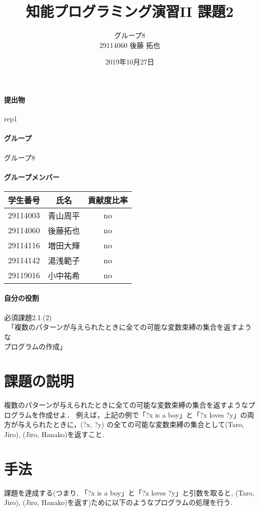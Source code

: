 \documentclass[uplatex,12pt]{jsarticle}
\title{知能プログラミング演習II 課題2}
\author{グループ8\\
  29114060 後藤 拓也\\
}
\date{2019年10月27日}
\begin{document}
\maketitle

\paragraph{提出物} rep1

\paragraph{グループ} グループ8

\paragraph{グループメンバー}
\begin{center}
\begin{tabular}{|c|c|c|}
  \hline
  学生番号&氏名&貢献度比率\\
  \hline\hline
  29114003&青山周平&no\\
  \hline
  29114060&後藤拓也&no\\
  \hline
  29114116&増田大輝&no\\
  \hline
  29114142&湯浅範子&no\\
  \hline
  29119016&小中祐希&no\\
  \hline
\end{tabular}
\end{center}
\paragraph{自分の役割} 必須課題2.1.(2)
\\　「複数のパターンが与えられたときに全ての可能な変数束縛の集合を返すような\\プログラムの作成」
\section{課題の説明}
\begin{screen}
複数のパターンが与えられたときに全ての可能な変数束縛の集合を返すようなプログラムを作成せよ．
例えば，上記の例で「?x is a boy」と「?x loves ?y」の両方が与えられたときに，(?x, ?y) の全ての可能な変数束縛の集合として{(Taro, Jiro), (Jiro, Hanako)}を返すこと.
\end{screen}

\section{手法}
課題を達成する(つまり, 「?x is a boy」と「?x loves ?y」と引数を取ると, {(Taro, Jiro), (Jiro, Hanako)}を返す)ために以下のようなプログラムの処理を行う.
\end{document}

